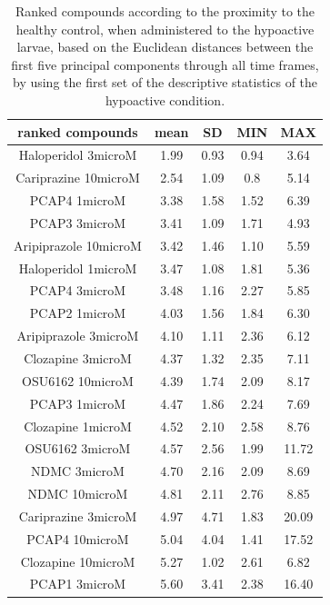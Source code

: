 \documentclass[a4paper,12pt]{article}
\begin{document}
\begin{table}[h!]\tiny
\centering
\caption{Ranked compounds according to the proximity to the healthy control, when administered to the hypoactive larvae, based on the Euclidean distances between the first five principal components through all time frames, by using the first set of the descriptive statistics of the hypoactive condition.}
\begin{tabular}{|c|c|c|c|c|}
\hline
ranked compounds             & mean & SD   & MIN  & MAX   \\ \hline
Haloperidol 3microM   & 1.99  & 0.93  & 0.94 & 3.64  \\ \hline
Cariprazine 10microM  & 2.54  & 1.09  & 0.8  & 5.14  \\ \hline
PCAP4 1microM       & 3.38  & 1.58  & 1.52 & 6.39  \\ \hline
PCAP3 3microM       & 3.41  & 1.09  & 1.71 & 4.93  \\ \hline
Aripiprazole 10microM & 3.42  & 1.46  & 1.10  & 5.59  \\ \hline
Haloperidol 1microM   & 3.47  & 1.08  & 1.81 & 5.36  \\ \hline
PCAP4 3microM       & 3.48  & 1.16  & 2.27 & 5.85  \\ \hline
PCAP2 1microM         & 4.03  & 1.56  & 1.84 & 6.30   \\ \hline
Aripiprazole 3microM  & 4.10   & 1.11  & 2.36 & 6.12  \\ \hline
Clozapine 3microM     & 4.37  & 1.32  & 2.35 & 7.11  \\ \hline
OSU6162 10microM      & 4.39  & 1.74  & 2.09 & 8.17  \\ \hline
PCAP3 1microM       & 4.47  & 1.86  & 2.24 & 7.69  \\ \hline
Clozapine 1microM     & 4.52  & 2.10   & 2.58 & 8.76  \\ \hline
OSU6162 3microM       & 4.57  & 2.56  & 1.99 & 11.72 \\ \hline
NDMC 3microM          & 4.70   & 2.16  & 2.09 & 8.69  \\ \hline
NDMC 10microM         & 4.81  & 2.11  & 2.76 & 8.85  \\ \hline
Cariprazine 3microM   & 4.97  & 4.71  & 1.83 & 20.09 \\ \hline
PCAP4 10microM      & 5.04  & 4.04  & 1.41 & 17.52 \\ \hline
Clozapine 10microM    & 5.27  & 1.02  & 2.61 & 6.82  \\ \hline
PCAP1 3microM         & 5.60   & 3.41  & 2.38 & 16.40  \\ \hline

\end{tabular}
\end{table}
\end{document}
